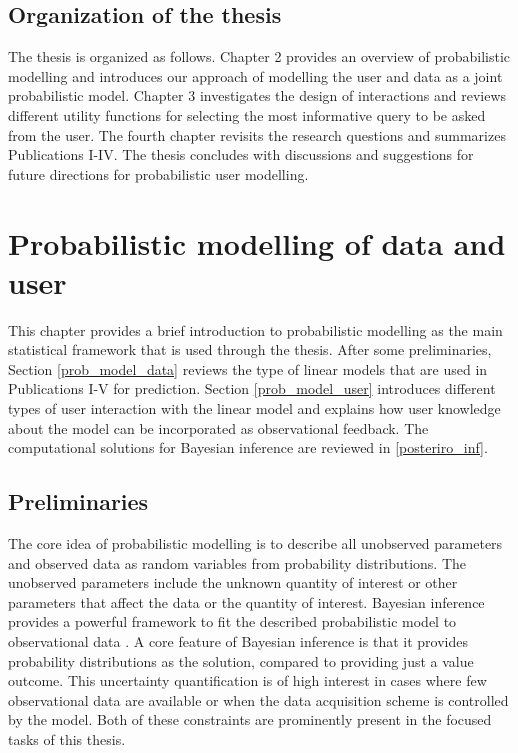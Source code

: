 \documentclass[dissertation,math,vertlayout,pdfa,colorlinks]{aaltoseries}
\begin{document}
\section{Organization of the thesis}

The thesis is organized as follows. Chapter 2 provides an overview of probabilistic modelling and introduces our approach of modelling the user and data as a joint probabilistic model. Chapter 3 investigates the design of interactions and reviews different utility functions for selecting the most informative query to be asked from the user. The fourth chapter revisits the research questions and summarizes Publications I-IV. The thesis concludes with discussions and suggestions for future directions for probabilistic user modelling.



\chapter{Probabilistic modelling of data and user} \label{prob_model_data_user}


This chapter provides a brief introduction to probabilistic modelling as the main statistical framework that is used through the thesis. After some preliminaries,  Section \ref{prob_model_data} reviews the type of linear models that are used in Publications I-V for prediction. Section \ref{prob_model_user} introduces different types of user interaction with the linear model and explains how user knowledge about the model can be incorporated as observational feedback. The computational solutions for Bayesian inference are reviewed in \ref{posteriro_inf}. %

\section{Preliminaries}
The core idea of probabilistic modelling is to describe all unobserved parameters and observed data as random variables from probability distributions. The unobserved parameters include the unknown quantity of interest or other parameters that affect the data or the quantity of interest. Bayesian inference provides a powerful framework to fit the described probabilistic model to observational data \cite{Gelman2013}. A core feature of Bayesian inference is that it provides probability distributions as the solution, compared to providing just a value outcome. %
This uncertainty quantification is of high interest in cases where few observational data are available or when the data acquisition scheme is controlled by the model. Both of these constraints are prominently present in the focused tasks of this thesis.
\end{document}
